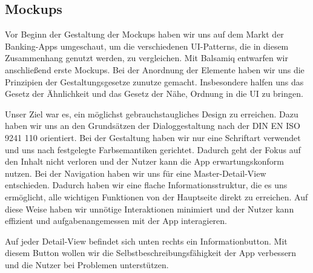 
\subsection{Mockups}
	Vor Beginn der Gestaltung der Mockups haben wir uns auf dem Markt der Banking-Apps umgeschaut, um die verschiedenen UI-Patterns, die in diesem Zusammenhang genutzt werden, zu vergleichen. Mit Balsamiq entwarfen wir anschließend erste Mockups. Bei der Anordnung der Elemente haben wir uns die Prinzipien der Gestaltungsgesetze zunutze gemacht. Insbesondere halfen uns das Gesetz der Ähnlichkeit und das Gesetz der Nähe, Ordnung in die UI zu bringen. 

	Unser Ziel war es, ein möglichst gebrauchstaugliches Design zu erreichen. Dazu haben wir uns an den Grundsätzen der Dialoggestaltung nach der DIN EN ISO 9241 110 orientiert. Bei der Gestaltung haben wir nur eine Schriftart verwendet und uns nach festgelegte Farbsemantiken gerichtet. Dadurch geht der Fokus auf den Inhalt nicht verloren und der Nutzer kann die App erwartungskonform nutzen. Bei der Navigation haben wir uns für eine Master-Detail-View entschieden. Dadurch haben wir eine flache Informationsstruktur, die es uns ermöglicht, alle wichtigen Funktionen von der Hauptseite direkt zu erreichen. Auf diese Weise haben wir unnötige Interaktionen minimiert und der Nutzer kann effizient und aufgabenangemessen mit der App interagieren.  

	Auf jeder Detail-View befindet sich unten rechts ein Informationbutton. Mit diesem Button wollen wir die Selbstbeschreibungsfähigkeit der App verbessern und die Nutzer bei Problemen unterstützen.
	
